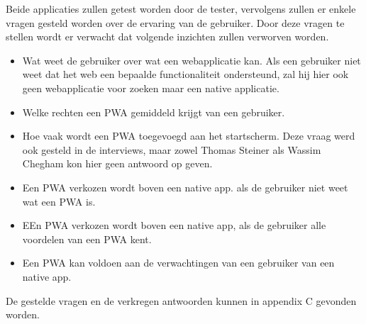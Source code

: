 Beide applicaties zullen getest worden door de tester, vervolgens zullen er enkele vragen gesteld worden over de ervaring van de gebruiker.
Door deze vragen te stellen wordt er verwacht dat volgende inzichten zullen verworven worden.
\begin{itemize}
	\item Wat weet de gebruiker over wat een webapplicatie kan. Als een gebruiker niet weet dat het web een bepaalde functionaliteit ondersteund, zal hij hier ook geen webapplicatie voor zoeken maar een native applicatie.
	\item Welke rechten een PWA gemiddeld krijgt van een gebruiker.
	\item Hoe vaak wordt een PWA toegevoegd aan het startscherm. Deze vraag werd ook gesteld in de interviews, maar zowel Thomas Steiner als Wassim Chegham kon hier geen antwoord op geven.
	\item Een PWA verkozen wordt boven een native app. als de gebruiker niet weet wat een PWA is.
	\item EEn PWA verkozen wordt boven een native app, als de gebruiker alle voordelen van een PWA kent.	
	\item Een PWA kan voldoen aan de verwachtingen van een gebruiker van een native app.
\end{itemize}

De gestelde vragen en de verkregen antwoorden kunnen in appendix C gevonden worden.

